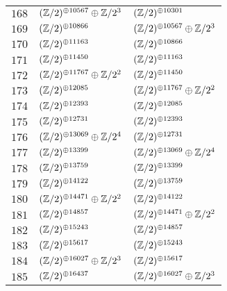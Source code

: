 \begin{supertabular}{|c|p{5.5cm}|p{5.5cm}|}
$168$%
&$(\mathbb{Z}/2)^{\oplus10567}\oplus\mathbb{Z}/2^{3}$%
&$(\mathbb{Z}/2)^{\oplus10301}$\\

$169$%
&$(\mathbb{Z}/2)^{\oplus10866}$%
&$(\mathbb{Z}/2)^{\oplus10567}\oplus\mathbb{Z}/2^{3}$\\

$170$%
&$(\mathbb{Z}/2)^{\oplus11163}$%
&$(\mathbb{Z}/2)^{\oplus10866}$\\

$171$%
&$(\mathbb{Z}/2)^{\oplus11450}$%
&$(\mathbb{Z}/2)^{\oplus11163}$\\

$172$%
&$(\mathbb{Z}/2)^{\oplus11767}\oplus\mathbb{Z}/2^{2}$%
&$(\mathbb{Z}/2)^{\oplus11450}$\\

$173$%
&$(\mathbb{Z}/2)^{\oplus12085}$%
&$(\mathbb{Z}/2)^{\oplus11767}\oplus\mathbb{Z}/2^{2}$\\

$174$%
&$(\mathbb{Z}/2)^{\oplus12393}$%
&$(\mathbb{Z}/2)^{\oplus12085}$\\

$175$%
&$(\mathbb{Z}/2)^{\oplus12731}$%
&$(\mathbb{Z}/2)^{\oplus12393}$\\

$176$%
&$(\mathbb{Z}/2)^{\oplus13069}\oplus\mathbb{Z}/2^{4}$%
&$(\mathbb{Z}/2)^{\oplus12731}$\\

$177$%
&$(\mathbb{Z}/2)^{\oplus13399}$%
&$(\mathbb{Z}/2)^{\oplus13069}\oplus\mathbb{Z}/2^{4}$\\

$178$%
&$(\mathbb{Z}/2)^{\oplus13759}$%
&$(\mathbb{Z}/2)^{\oplus13399}$\\

$179$%
&$(\mathbb{Z}/2)^{\oplus14122}$%
&$(\mathbb{Z}/2)^{\oplus13759}$\\

$180$%
&$(\mathbb{Z}/2)^{\oplus14471}\oplus\mathbb{Z}/2^{2}$%
&$(\mathbb{Z}/2)^{\oplus14122}$\\

$181$%
&$(\mathbb{Z}/2)^{\oplus14857}$%
&$(\mathbb{Z}/2)^{\oplus14471}\oplus\mathbb{Z}/2^{2}$\\

$182$%
&$(\mathbb{Z}/2)^{\oplus15243}$%
&$(\mathbb{Z}/2)^{\oplus14857}$\\

$183$%
&$(\mathbb{Z}/2)^{\oplus15617}$%
&$(\mathbb{Z}/2)^{\oplus15243}$\\

$184$%
&$(\mathbb{Z}/2)^{\oplus16027}\oplus\mathbb{Z}/2^{3}$%
&$(\mathbb{Z}/2)^{\oplus15617}$\\

$185$%
&$(\mathbb{Z}/2)^{\oplus16437}$%
&$(\mathbb{Z}/2)^{\oplus16027}\oplus\mathbb{Z}/2^{3}$\\


\end{supertabular}
